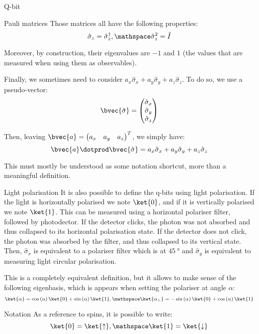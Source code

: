 \documentclass[a4paper]{article}
\begin{document}
\begin{parag}{Q-bit}
\begin{subparag}{Pauli matrices}
        Those matrices all have the following properties:
        \[\hat{\sigma}_z = \hat{\sigma}_z^{\dagger}, \mathspace \hat{\sigma}_z^2 = \hat{I}\]

        Moreover, by construction, their eigenvalues are $-1$ and $1$ (the values that are measured when using them as observables).

        Finally, we sometimes need to consider $a_x \hat{\sigma}_x + a_y \hat{\sigma}_y + a_z \hat{\sigma}_z$. To do so, we use a pseudo-vector: 
        \[\bvec{\hat{\sigma}} = \begin{pmatrix} \hat{\sigma}_x \\ \hat{\sigma}_y \\ \hat{\sigma}_z \end{pmatrix} \]
        
        Then, leaving $\bvec{a} = \begin{pmatrix} a_x & a_y & a_z \end{pmatrix} ^T$, we simply have: 
        \[\bvec{a} \dotprod \bvec{\hat{\sigma}} = a_x \hat{\sigma}_x + a_y \hat{\sigma}_y + a_z \hat{\sigma}_z\]
        
        This must mostly be understood as some notation shortcut, more than a meaningful definition.
    \end{subparag}

    \begin{subparag}{Light polarisation}
        It is also possible to define the q-bits using light polarisation. If the light is horizontally polarised we note $\ket{0}$, and if it is vertically polarised we note $\ket{1}$. This can be measured using a horizontal polariser filter, followed by photodector. If the detector clicks, the photon was not absorbed and thus collapsed to its horizontal polarisation state. If the detector does not click, the photon was absorbed by the filter, and thus collapsed to its vertical state. Then, $\hat{\sigma}_x$ is equivalent to a polariser filter which is at $\SI{45}{\degree}$ and $\hat{\sigma}_y$ is equivalent to measuring light circular polarisation.

        This is a completely equivalent definition, but it allows to make sense of the following eigenbasis, which is appears when setting the polariser at angle $\alpha$:
        \[\ket{\alpha} = \cos\left(\alpha\right) \ket{0} + \sin\left(\alpha\right)\ket{1}, \mathspace \ket{\alpha_{\perp}} = -\sin\left(\alpha\right) \ket{0} + \cos\left(\alpha\right) \ket{1}\]
    \end{subparag}

    \begin{subparag}{Notation}
        As a reference to spins, it is possible to write: 
        \[\ket{0} = \ket{\uparrow}, \mathspace \ket{1} = \ket{\downarrow}\]
    \end{subparag}
\end{parag}
\end{document}
